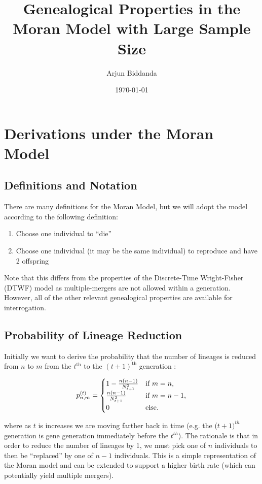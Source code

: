 \documentclass[10.5pt]{article}
\title{Genealogical Properties in the Moran Model with Large Sample Size}
\author{Arjun Biddanda}
\date{\today}
\begin{document}
\maketitle

\section{Derivations under the Moran Model}

\subsection{Definitions and Notation}

There are many definitions for the Moran Model, but we will adopt the model according to the following definition:

\begin{enumerate}
	\item Choose one individual to ``die''
	\item Choose one individual (it may be the same individual) to reproduce and have 2 offspring
\end{enumerate}

Note that this differs from the properties of the Discrete-Time Wright-Fisher (DTWF) model as multiple-mergers are not allowed within a generation. However, all of the other relevant genealogical properties are available for interrogation. 

\subsection{Probability of Lineage Reduction}
Initially we want to derive the probability that the number of lineages is reduced from $n$ to $m$ from the $t^{\text{th}}$ to the $(t+1)^{\text{th}}$ generation :

\begin{equation}
	p^{(t)}_{n,m} = 
	\begin{cases} 1 - \frac{n(n-1)}{N^2_{t+1}}  & \text{if $m = n$,}
		\\
		\frac{n(n-1)}{N^2_{t+1}} &\text{if $ m = n - 1$,}
		\\
		0 &\text{else.}
	\end{cases}
\end{equation}

where as $t$ is increases we are moving farther back in time (e.g. the ($t+1)^{th}$ generation is gene generation immediately before the $t^{th}$). The rationale is that in order to reduce the number of lineages by 1, we must pick one of $n$ individuals to then be ``replaced'' by one of $n-1$ individuals. This is a simple representation of the Moran model and can be extended to support a higher birth rate (which can potentially yield multiple mergers).
\end{document}
